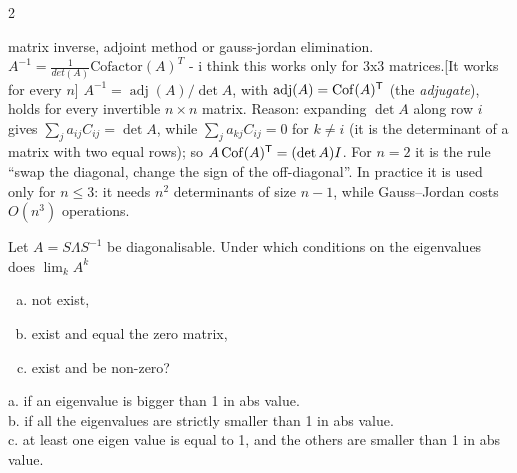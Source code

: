 \begin{paracol}{2}
\begin{answer}{matrix inverse, adjoint method or gauss-jordan elimination. $A^{-1}=\frac{1}{det(A)} \text{Cofactor}(A)^T$ - i think this works only for 3x3 matrices.}[It works for every $n$]
$A^{-1}=\operatorname{adj}(A)/\det A$, with $\operatorname{adj}(A)=\operatorname{Cof}(A)^{\mathsf T}$ (the \emph{adjugate}), holds for
every invertible $n\times n$ matrix. Reason: expanding $\det A$ along row $i$ gives
$\sum_ja_{ij}C_{ij}=\det A$, while $\sum_ja_{kj}C_{ij}=0$ for $k\ne i$ (it is the determinant of a matrix with
two equal rows); so $A\operatorname{Cof}(A)^{\mathsf T}=(\det A)I$. For $n=2$ it is the rule ``swap the diagonal, change
the sign of the off-diagonal''. In practice it is used only for $n\le3$: it needs $n^2$ determinants of
size $n-1$, while Gauss--Jordan costs $O(n^3)$ operations.
\end{answer}

\begin{exercise}[PS1 (2024), Problem 2]
Let $A=S\Lambda S^{-1}$ be diagonalisable. Under which conditions on the eigenvalues does $\lim_kA^k$
\begin{enumerate}[(a)]
  \item not exist,
  \item exist and equal the zero matrix,
  \item exist and be non-zero?
\end{enumerate}
\end{exercise}
\begin{mysolution}
  a. if an eigenvalue is bigger than 1 in abs value. \\
  b. if all the eigenvalues are strictly smaller than 1 in abs value. \\
  c. at least one eigen value is equal to 1, and the others are smaller than 1 in abs value.
\end{mysolution}


\end{paracol}
